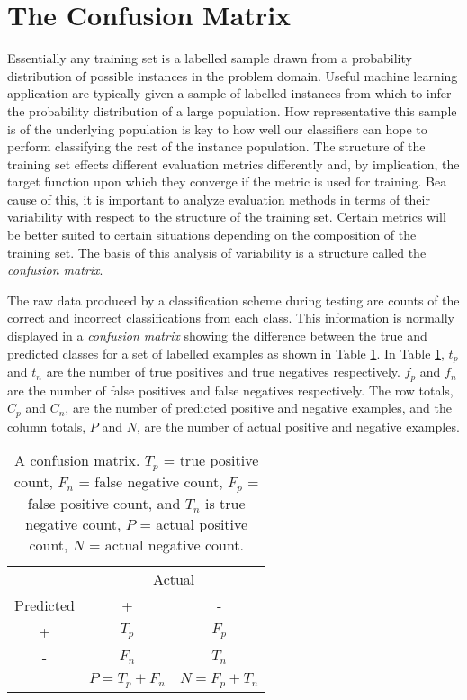 \documentclass[10pt]{unbthesis}
\begin{document}
\section{The Confusion Matrix}
\label{sec:confusionmatrix}
Essentially any training set is a labelled sample drawn from a
probability distribution of possible instances in the problem
domain. Useful machine learning application are typically given a
sample of labelled instances from which to infer the probability
distribution of a large population. How representative
this sample is of the underlying population is key to how well our
classifiers can hope to perform classifying the rest of the instance
population. The structure of the training set effects different evaluation
metrics differently and, by implication, the target function upon
which they converge if the metric is used for training. Bea cause of
this, it is
important to analyze evaluation methods 
in terms of their variability with respect to the structure of the
training set. Certain metrics will be better suited to certain
situations depending on the composition of the training set. The basis
of this analysis of variability is a structure called the
\textit{confusion matrix}.

The raw data produced by a classification scheme during testing are
counts of the correct and incorrect classifications from each
class. This information is normally displayed in a \textit{confusion
  matrix} showing the difference between the true and predicted
classes for a set of labelled examples as shown in Table
\ref{tab:confusionmatrix}. In Table \ref{tab:confusionmatrix}, \(t_p\)
and \(t_n\) are the number of true positives and true negatives
respectively. \(f_p\) and \(f_n\) are the number of false positives
and false negatives respectively. The row totals, \(C_p\) and \(C_n\),
are the number of predicted positive and negative examples, and the
column totals, \(P\) and \(N\), are the number of actual positive
and negative examples. 

\begin{table}
\centering
  \begin{tabular}{c|c|c|}
    & \multicolumn{2}{|c|}{Actual} \\ \cline{1-3}
 Predicted & +                   & -                  \\ \hline
    +      & \(T_p\)             & \(F_p\)             \\ \hline
    -      & \(F_n\)             & \(T_n\)             \\ \hline
           & \(P = T_p + F_n\)   & \(N = F_p + T_n\)    \\ \cline{2-3}
  \end{tabular}
  \caption{A confusion matrix. \(T_p\) = true positive count, \(F_n\)
  = false negative count, \(F_p\) = false positive count, and \(T_n\)
  is true negative count, \(P\) = actual positive count, \(N\) = actual
  negative count.}
  \label{tab:confusionmatrix}
\end{table}
\end{document}

